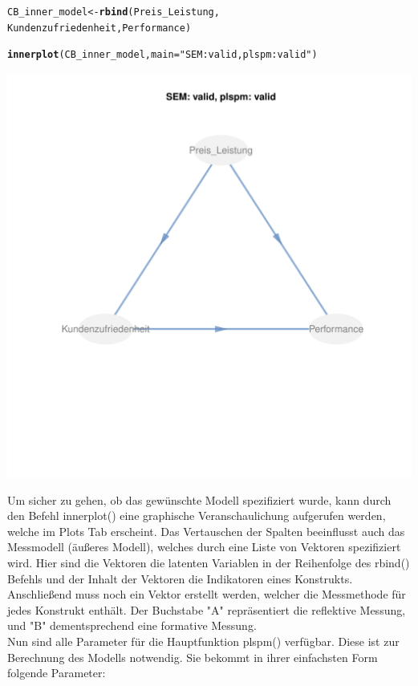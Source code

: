 \documentclass{article}\usepackage[]{graphicx}\usepackage[]{color}
\makeatletter
\def\maxwidth{ %
  \ifdim\Gin@nat@width>\linewidth
    \linewidth
  \else
    \Gin@nat@width
  \fi
}
\newcommand{\hlstr}[1]{\textcolor[rgb]{0.192,0.494,0.8}{#1}}%
\newcommand{\hlstd}[1]{\textcolor[rgb]{0.345,0.345,0.345}{#1}}%
\newcommand{\hlkwb}[1]{\textcolor[rgb]{0.69,0.353,0.396}{#1}}%
\newcommand{\hlkwc}[1]{\textcolor[rgb]{0.333,0.667,0.333}{#1}}%
\newcommand{\hlkwd}[1]{\textcolor[rgb]{0.737,0.353,0.396}{\textbf{#1}}}%
\newenvironment{kframe}{%
 \def\at@end@of@kframe{}%
 \ifinner\ifhmode%
  \def\at@end@of@kframe{\end{minipage}}%
  \begin{minipage}{\columnwidth}%
 \fi\fi%
 \def\FrameCommand##1{\hskip\@totalleftmargin \hskip-\fboxsep
 \colorbox{shadecolor}{##1}\hskip-\fboxsep
     \hskip-\linewidth \hskip-\@totalleftmargin \hskip\columnwidth}%
 \MakeFramed {\advance\hsize-\width
   \@totalleftmargin\z@ \linewidth\hsize
   \@setminipage}}%
 {\par\unskip\endMakeFramed%
 \at@end@of@kframe}
\newenvironment{knitrout}{}{} %
\makeatother
\begin{document}
\begin{knitrout}
\begin{kframe}
\begin{alltt}
\hlstd{CB_inner_model} \hlkwb{<-} \hlkwd{rbind}\hlstd{(Preis_Leistung,}
                        \hlstd{Kundenzufriedenheit, Performance)}

\hlkwd{innerplot}\hlstd{(CB_inner_model,} \hlkwc{main}\hlstd{=}\hlstr{"SEM: valid, plspm: valid"}\hlstd{)}
\end{alltt}
\end{kframe}
\includegraphics[width=\maxwidth]{figure/mis-2} 

\end{knitrout}
Um sicher zu gehen, ob das gewünschte Modell spezifiziert wurde, kann durch den Befehl innerplot() eine graphische Veranschaulichung aufgerufen werden, welche im Plots Tab erscheint. Das Vertauschen der Spalten beeinflusst auch das Messmodell (äußeres Modell), welches durch eine Liste von Vektoren spezifiziert wird. Hier sind die Vektoren die latenten Variablen in der Reihenfolge des rbind() Befehls und der Inhalt der Vektoren die Indikatoren eines Konstrukts. Anschließend muss noch ein Vektor erstellt werden, welcher die Messmethode für jedes Konstrukt enthält. Der Buchstabe "A" repräsentiert die reflektive Messung, und "B" dementsprechend eine formative Messung.\\
Nun sind alle Parameter für die Hauptfunktion plspm() verfügbar. Diese ist zur Berechnung des Modells notwendig. Sie bekommt in ihrer einfachsten Form folgende Parameter:\\
\end{document}

